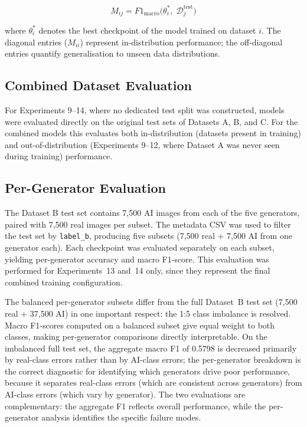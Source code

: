 \begin{equation}
  M_{ij} = F1_{\text{macro}}\bigl(\theta_i^*,\; \mathcal{D}_j^{\text{test}}\bigr)
  \label{eq:generalisation_matrix}
\end{equation}

where $\theta_i^*$ denotes the best checkpoint of the model trained on dataset $i$. The diagonal
entries ($M_{ii}$) represent in-distribution performance; the off-diagonal entries quantify
generalisation to unseen data distributions.

\subsection{Combined Dataset Evaluation}
\label{sec:combined_eval}

For Experiments 9--14, where no dedicated test split was constructed, models were evaluated
directly on the original test sets of Datasets A, B, and C. For the combined models this
evaluates both in-distribution (datasets present in training) and out-of-distribution
(Experiments 9--12, where Dataset A was never seen during training) performance.

\subsection{Per-Generator Evaluation}
\label{sec:pergenerator_eval}

The Dataset B test set contains 7,500 AI images from each of the five generators, paired with
7,500 real images per subset. The metadata CSV was used to filter the test set by
\texttt{label\_b}, producing five subsets (7,500 real + 7,500 AI from one generator each).
Each checkpoint was evaluated separately on each subset, yielding per-generator accuracy and
macro F1-score. This evaluation was performed for Experiments~13 and~14 only, since they
represent the final combined training configuration.

The balanced per-generator subsets differ from the full Dataset~B test set (7,500 real +
37,500 AI) in one important respect: the 1:5 class imbalance is resolved. Macro F1-scores
computed on a balanced subset give equal weight to both classes, making per-generator
comparisons directly interpretable. On the imbalanced full test set, the aggregate macro
F1 of 0.5798 is decreased primarily by real-class errors rather than by AI-class errors;
the per-generator breakdown is the correct diagnostic for identifying which generators
drive poor performance, because it separates real-class errors (which are consistent across
generators) from AI-class errors (which vary by generator). The two evaluations are
complementary: the aggregate F1 reflects overall performance, while the
per-generator analysis identifies the specific failure modes.

